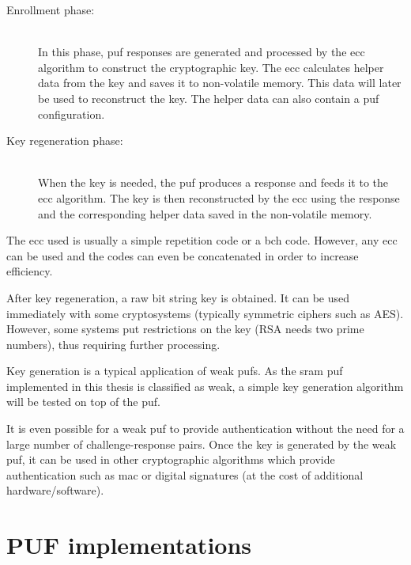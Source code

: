 \begin{description}
    \item[Enrollment phase:] \hfill \\ In this phase, \gls{puf} responses are generated and processed by the \gls{ecc} algorithm to construct the cryptographic key. The \gls{ecc} calculates helper data from the key and saves it to non-volatile memory. This data will later be used to reconstruct the key. The helper data can also contain a \gls{puf} configuration.
    \item[Key regeneration phase:] \hfill \\ When the key is needed, the \gls{puf} produces a response and feeds it to the \gls{ecc} algorithm. The key is then reconstructed by the \gls{ecc} using the response and the corresponding helper data saved in the non-volatile memory.
\end{description}

The \gls{ecc} used is usually a simple repetition code or a \gls{bch} code. However, any \gls{ecc} can be used and the codes can even be concatenated in order to increase efficiency.\cite{Bosch2008}

After key regeneration, a raw bit string key is obtained. It can be used immediately with some cryptosystems (typically symmetric ciphers such as AES). However, some systems put restrictions on the key (RSA needs two prime numbers), thus requiring further processing. %

Key generation is a typical application of weak \glspl{puf}\cite{Herder2014}. As the \gls{sram} \gls{puf} implemented in this thesis is classified as weak, a simple key generation algorithm will be tested on top of the \gls{puf}.

It is even possible for a weak \gls{puf} to provide authentication without the need for a large number of challenge-response pairs. Once the key is generated by the weak \gls{puf}, it can be used in other cryptographic algorithms which provide authentication such as \gls{mac} or digital signatures (at the cost of additional hardware/software).\cite{Herder2014}



\section{PUF implementations}

